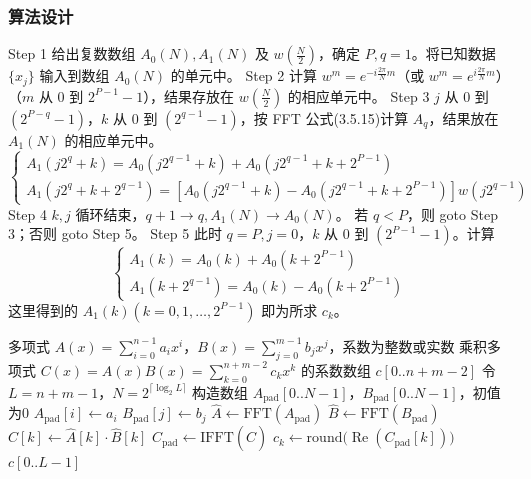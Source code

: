\documentclass{article}
\begin{document}
\subsubsection{算法设计}
\begin{algorithm}[H]
\caption{快速傅里叶变换实现方法}
\begin{algorithmic}[1]
    \STATE Step 1 给出复数数组 \( A_0(N), A_1(N) \) 及 \( w \left( \frac{N}{2} \right) \)，确定 \( P, q = 1 \)。将已知数据 \(\{x_j\}\) 输入到数组 \( A_0(N) \) 的单元中。
    \STATE Step 2 计算 \( w^m = e^{-i\frac{2\pi}{N}m} \)（或 \( w^m = e^{i\frac{2\pi}{N}m} \)）（\( m \) 从 0 到 \( 2^{P-1}-1 \)），结果存放在 \( w\left(\frac{N}{2}\right) \) 的相应单元中。
    \STATE Step 3 \( j \) 从 0 到 \( (2^{P-q}-1) \)，\( k \) 从 0 到 \( (2^{q-1}-1) \)，按 FFT 公式(3.5.15)计算 \( A_q \)，结果放在 \( A_1(N) \) 的相应单元中。
    \STATE \[
    \begin{cases}
        A_1(j2^q + k) = A_0(j2^{q-1} + k) + A_0(j2^{q-1} + k + 2^{P-1}) \\
        A_1(j2^q + k + 2^{q-1}) = [A_0(j2^{q-1} + k) - A_0(j2^{q-1} + k + 2^{P-1})]w(j2^{q-1})
    \end{cases}
    \]
    \STATE Step 4 \( k, j \) 循环结束，\( q+1 \to q, A_1(N) \to A_0(N) \)。
    \STATE 若 \( q < P \)，则 goto Step 3；否则 goto Step 5。
    \STATE Step 5 此时 \( q = P, j = 0 \)，\( k \) 从 0 到 \( (2^{P-1}-1) \)。计算
    \STATE \[
    \begin{cases}
        A_1(k) = A_0(k) + A_0(k + 2^{P-1}) \\
        A_1(k + 2^{q-1}) = A_0(k) - A_0(k + 2^{P-1})
    \end{cases}
    \]
    \STATE 这里得到的 \( A_1(k)(k = 0, 1, \dots, 2^{P-1}) \) 即为所求 \( c_k \)。
\end{algorithmic}
\end{algorithm}

\begin{algorithm}[H]
\caption{快速傅里叶变换实现多项式乘法}
\begin{algorithmic}[1]
    \REQUIRE 多项式 $A(x)=\sum_{i=0}^{n-1} a_i x^i$，$B(x)=\sum_{j=0}^{m-1} b_j x^j$，系数为整数或实数
    \ENSURE 乘积多项式 $C(x)=A(x)B(x)=\sum_{k=0}^{n+m-2} c_k x^k$ 的系数数组 $c[0..n+m-2]$
    \STATE 令 $L = n + m - 1$，$N = 2^{\lceil \log_2 L \rceil}$  
    \STATE 构造数组 $A_{\text{pad}}[0..N-1]$，$B_{\text{pad}}[0..N-1]$，初值为0
     \STATE $A_{\text{pad}}[i] \gets a_i$ \ENDFOR
     \STATE $B_{\text{pad}}[j] \gets b_j$ \ENDFOR
    \STATE $\hat{A} \gets \text{FFT}(A_{\text{pad}})$  
    \STATE $\hat{B} \gets \text{FFT}(B_{\text{pad}})$
     \STATE $\hat{C}[k] \gets \hat{A}[k] \cdot \hat{B}[k]$ \ENDFOR
    \STATE $C_{\text{pad}} \gets \text{IFFT}(\hat{C})$  
        \STATE $c_k \gets \text{round}\bigl(\operatorname{Re}(C_{\text{pad}}[k])\bigr)$ 
    \ENDFOR
    \STATE \RETURN $c[0..L-1]$
\end{algorithmic}
\end{algorithm}
\end{document}
